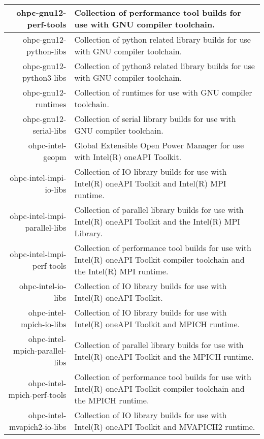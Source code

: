 \begin{tabularx}{\textwidth}{r|X}
\hline
ohpc-gnu12-perf-tools & Collection of performance tool builds for use with GNU compiler toolchain. \\
\hline
ohpc-gnu12-python-libs & Collection of python related library builds for use with GNU compiler toolchain. \\
\hline
ohpc-gnu12-python3-libs & Collection of python3 related library builds for use with GNU compiler toolchain. \\
\hline
ohpc-gnu12-runtimes & Collection of runtimes for use with GNU compiler toolchain. \\
\hline
ohpc-gnu12-serial-libs & Collection of serial library builds for use with GNU compiler toolchain. \\
\hline
ohpc-intel-geopm & Global Extensible Open Power Manager for use with Intel(R) oneAPI Toolkit. \\
\hline
ohpc-intel-impi-io-libs & Collection of IO library builds for use with Intel(R) oneAPI Toolkit and Intel(R) MPI runtime. \\
\hline
ohpc-intel-impi-parallel-libs & Collection of parallel library builds for use with Intel(R) oneAPI Toolkit and the Intel(R) MPI Library. \\
\hline
ohpc-intel-impi-perf-tools & Collection of performance tool builds for use with Intel(R) oneAPI Toolkit compiler toolchain and the Intel(R) MPI runtime. \\
\hline
ohpc-intel-io-libs & Collection of IO library builds for use with Intel(R) oneAPI Toolkit. \\
\hline
ohpc-intel-mpich-io-libs & Collection of IO library builds for use with Intel(R) oneAPI Toolkit and MPICH runtime. \\
\hline
ohpc-intel-mpich-parallel-libs & Collection of parallel library builds for use with Intel(R) oneAPI Toolkit and the MPICH runtime. \\
\hline
ohpc-intel-mpich-perf-tools & Collection of performance tool builds for use with Intel(R) oneAPI Toolkit compiler toolchain and the MPICH runtime. \\
\hline
ohpc-intel-mvapich2-io-libs & Collection of IO library builds for use with Intel(R) oneAPI Toolkit and MVAPICH2 runtime. \\
\hline
\bottomrule
\end{tabularx}
